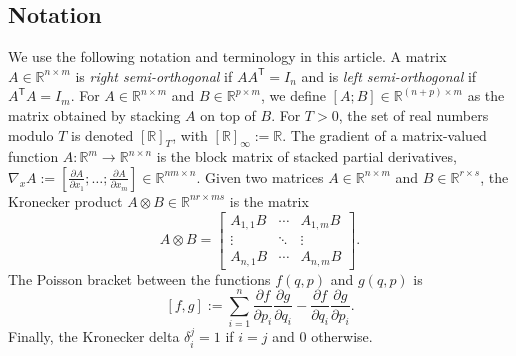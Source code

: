 \documentclass[journal,twoside,web]{ieeecolor}
\newcommand*{\tpose}{^\mathsf{T}}
\newcommand*{\Rt}[1]{[\R]_{#1}}
\newcommand*{\R}{\mathbb{R}}
\newcommand*{\Id}[1]{I_{#1}}
\newcommand*{\pdiff}[2]{\frac{\partial #1}{\partial #2}}
\begin{document}
\subsection{Notation}
We use the following notation and terminology in this article.
A matrix \(A \in \R^{n \times m}\) is \textit{right semi-orthogonal} if
\(A A\tpose = \Id{n}\) and is \textit{left semi-orthogonal} if 
\(A\tpose A = \Id{m}\).
For \(A \in \R^{n\times m}\) and \(B \in \R^{p \times m}\),
we define \([A;B] \in \R^{(n+p)\times m}\) as the matrix obtained by stacking \(A\)
on top of \(B\). 
For \(T > 0\), the set of real numbers modulo \(T\) is denoted \(\Rt{T}\), with
\(\Rt{\infty} := \R\).
The gradient of a matrix-valued function 
\(A : \R^m \rightarrow \R^{n\times n}\) is the block matrix of stacked partial
derivatives, 
\(\nabla_xA := [\pdiff{A}{x_1};\ldots;\pdiff{A}{x_m}] \in \R^{nm \times n}\).
Given two matrices \(A \in \R^{n \times m}\) and \(B \in \R^{r \times s}\), the
Kronecker product \cite{kronprod} \(A \otimes B \in \R^{nr \times ms}\) is the
matrix
\begin{equation}\label{eqn:kronprod}
    A \otimes B = \begin{bmatrix}
        A_{1,1}B & \cdots & A_{1,m} B \\
        \vdots & \ddots & \vdots \\
        A_{n,1} B & \cdots & A_{n,m} B
    \end{bmatrix} 
    .
\end{equation}
The Poisson bracket \cite{landau_mechanics} between the functions
\(f(q,p)\) and \(g(q,p)\) is
\begin{equation}\label{eqn:poisson-bracket}
    [f,g] := \sum \limits_{i=1}^n \pdiff{f}{p_i}\pdiff{g}{q_i} - 
        \pdiff{f}{q_i}\pdiff{g}{p_i}
    .
\end{equation}
Finally, the Kronecker delta \(\delta_i^j = 1\) if \(i = j\) and \(0\)
otherwise.

\end{document}
